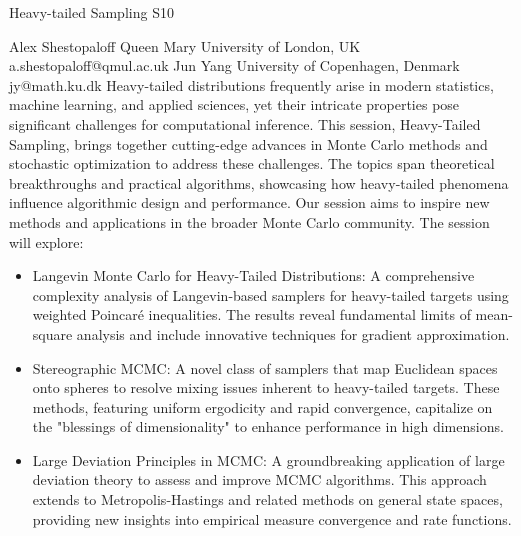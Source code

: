 \begin{session}
 {Heavy-tailed Sampling}%
 {}%
 {}%
 {}%
 {}%
 {}%
 {}%
 {S10}%
 {}%

 {Alex Shestopaloff}%
 {Queen Mary University of London, UK}%
 {a.shestopaloff@qmul.ac.uk}%
 {Jun Yang}%
 {University of Copenhagen, Denmark}%
 {jy@math.ku.dk}%
 Heavy-tailed distributions frequently arise in modern statistics, machine learning, and applied sciences, yet their intricate properties pose significant challenges for computational inference. This session, Heavy-Tailed Sampling, brings together cutting-edge advances in Monte Carlo methods and stochastic optimization to address these challenges. The topics span theoretical breakthroughs and practical algorithms, showcasing how heavy-tailed phenomena influence algorithmic design and performance. Our session aims to inspire new methods and applications in the broader Monte Carlo community. The session will explore:
 \begin{itemize}
 \item
 Langevin Monte Carlo for Heavy-Tailed Distributions: A comprehensive complexity analysis of Langevin-based samplers for heavy-tailed targets using weighted Poincaré inequalities. The results reveal fundamental limits of mean-square analysis and include innovative techniques for gradient approximation.
 \item
 Stereographic MCMC: A novel class of samplers that map Euclidean spaces onto spheres to resolve mixing issues inherent to heavy-tailed targets. These methods, featuring uniform ergodicity and rapid convergence, capitalize on the "blessings of dimensionality" to enhance performance in high dimensions.
 \item
 Large Deviation Principles in MCMC: A groundbreaking application of large deviation theory to assess and improve MCMC algorithms. This approach extends to Metropolis-Hastings and related methods on general state spaces, providing new insights into empirical measure convergence and rate functions.

\end{itemize}
\end{session}
